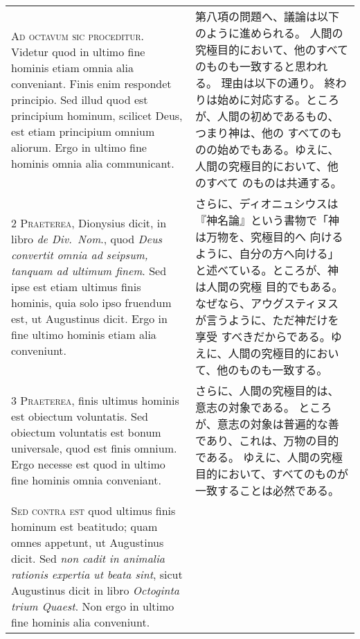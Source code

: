 \documentclass[10pt]{jsarticle} %
\begin{document}
\begin{longtable}{p{21em}p{21em}}


{\Huge A}{\scshape d octavum sic proceditur}. Videtur quod
in ultimo fine hominis etiam omnia alia conveniant. Finis enim respondet
principio. Sed illud quod est principium hominum, scilicet Deus, est
etiam principium omnium aliorum. Ergo in ultimo fine hominis omnia alia
communicant.


&

第八項の問題へ、議論は以下のように進められる。
人間の究極目的において、他のすべてのものも一致すると思われる。
理由は以下の通り。
終わりは始めに対応する。ところが、人間の初めであるもの、つまり神は、他の
 すべてのものの始めでもある。ゆえに、人間の究極目的において、他のすべて
 のものは共通する。


\\


{\scshape 2 Praeterea}, Dionysius dicit, in libro {\itshape de
Div.~Nom}., quod {\itshape Deus convertit omnia ad seipsum, tanquam ad ultimum
finem}. Sed ipse est etiam ultimus finis hominis, quia solo ipso fruendum
est, ut Augustinus dicit. Ergo in fine ultimo hominis etiam alia
conveniunt.


&


さらに、ディオニュシウスは『神名論』という書物で「神は万物を、究極目的へ
 向けるように、自分の方へ向ける」と述べている。ところが、神は人間の究極
 目的でもある。なぜなら、アウグスティヌスが言うように、ただ神だけを享受
 すべきだからである。ゆえに、人間の究極目的において、他のものも一致する。

\\


{\scshape 3 Praeterea}, finis ultimus hominis est
obiectum voluntatis. Sed obiectum voluntatis est bonum universale, quod
est finis omnium. Ergo necesse est quod in ultimo fine hominis omnia
conveniant.


&

さらに、人間の究極目的は、意志の対象である。
ところが、意志の対象は普遍的な善であり、これは、万物の目的である。
ゆえに、人間の究極目的において、すべてのものが一致することは必然である。


\\


{\scshape Sed contra est} quod ultimus finis
hominum est beatitudo; quam omnes appetunt, ut Augustinus dicit. Sed {\itshape non
cadit in animalia rationis expertia ut beata sint}, sicut Augustinus
dicit in libro {\itshape Octoginta trium Quaest}. Non ergo in ultimo fine hominis
alia conveniunt.



\end{longtable}
\end{document}
